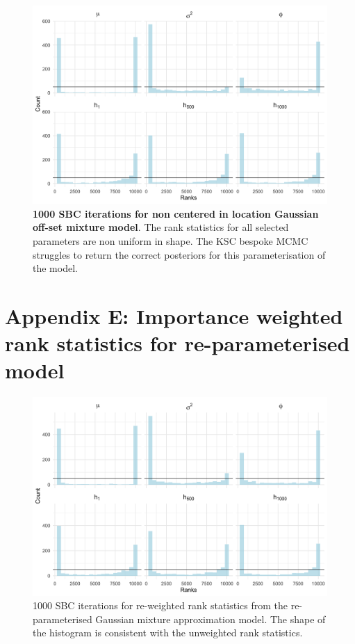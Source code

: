 \documentclass[12pt, a4paper]{article}
\begin{document}
    \begin{figure}[H]
        \centering
        \includegraphics[scale=0.1]{results/ksc_ncp_1k.png}
        \caption{\textbf{1000 SBC iterations for non centered in location Gaussian off-set mixture model}. The rank statistics for all selected parameters are non uniform in shape. The KSC bespoke MCMC struggles to return the correct posteriors for this parameterisation of the model.}
        \label{fig:ncpksc1k}
    \end{figure}
    
\section{Appendix E: Importance weighted rank statistics for re-parameterised model}

\begin{figure}[H]
    \centering
    \includegraphics[scale=0.09]{results/weighted_ksc_ncp_1k.png}
    \caption{1000 SBC iterations for re-weighted rank statistics from the re-parameterised Gaussian mixture approximation model. The shape of the histogram is consistent with the unweighted rank statistics.}
    \label{fig:ncpreweight1k}
\end{figure}
\end{document}
